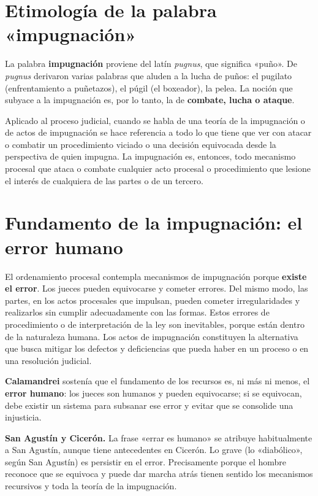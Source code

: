 \documentclass[12pt,oneside]{book}
\begin{document}
\section{Etimología de la palabra «impugnación»}

La palabra \textbf{impugnación} proviene del latín \textit{pugnus}, que significa «puño». De \textit{pugnus} derivaron varias palabras que aluden a la lucha de puños: el pugilato (enfrentamiento a puñetazos), el púgil (el boxeador), la pelea. La noción que subyace a la impugnación es, por lo tanto, la de \textbf{combate, lucha o ataque}.

Aplicado al proceso judicial, cuando se habla de una teoría de la impugnación o de actos de impugnación se hace referencia a todo lo que tiene que ver con atacar o combatir un procedimiento viciado o una decisión equivocada desde la perspectiva de quien impugna. La impugnación es, entonces, todo mecanismo procesal que ataca o combate cualquier acto procesal o procedimiento que lesione el interés de cualquiera de las partes o de un tercero.

\section{Fundamento de la impugnación: el error humano}

El ordenamiento procesal contempla mecanismos de impugnación porque \textbf{existe el error}. Los jueces pueden equivocarse y cometer errores. Del mismo modo, las partes, en los actos procesales que impulsan, pueden cometer irregularidades y realizarlos sin cumplir adecuadamente con las formas. Estos errores de procedimiento o de interpretación de la ley son inevitables, porque están dentro de la naturaleza humana. Los actos de impugnación constituyen la alternativa que busca mitigar los defectos y deficiencias que pueda haber en un proceso o en una resolución judicial.

\textbf{Calamandrei} sostenía que el fundamento de los recursos es, ni más ni menos, el \textbf{error humano}: los jueces son humanos y pueden equivocarse; si se equivocan, debe existir un sistema para subsanar ese error y evitar que se consolide una injusticia.

\begin{note}
\textbf{San Agustín y Cicerón.} La frase «errar es humano» se atribuye habitualmente a San Agustín, aunque tiene antecedentes en Cicerón. Lo grave (lo «diabólico», según San Agustín) es persistir en el error. Precisamente porque el hombre reconoce que se equivoca y puede dar marcha atrás tienen sentido los mecanismos recursivos y toda la teoría de la impugnación.
\end{note}
\end{document}
